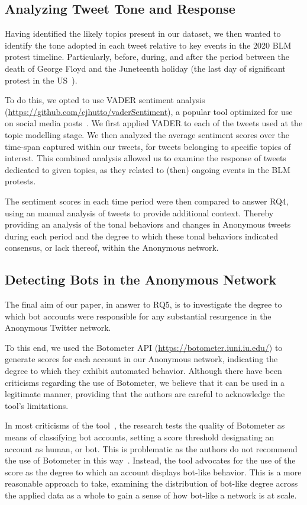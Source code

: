 \documentclass[letterpaper]{article}
\begin{document}
\subsection{Analyzing Tweet Tone and Response}

Having identified the likely topics present in our dataset, we then wanted to identify the tone adopted in each tweet relative to key events in the 2020 BLM protest timeline. Particularly, before, during, and after the period between the death of George Floyd and the Juneteenth holiday (the last day of significant protest in the US~\cite{NYT2020}).

To do this, we opted to use VADER sentiment analysis (\url{https://github.com/cjhutto/vaderSentiment}), a popular tool optimized for use on social media posts~\cite{Gilbert2014}. We first applied VADER to each of the tweets used at the topic modelling stage. We then analyzed the average sentiment scores over the time-span captured within our tweets, for tweets belonging to specific topics of interest. This combined analysis allowed us to examine the response of tweets dedicated to given topics, as they related to (then) ongoing events in the BLM protests.

The sentiment scores in each time period were then compared to answer RQ4, using an manual analysis of tweets to provide additional context. Thereby providing an analysis of the tonal behaviors and changes in Anonymous tweets during each period and the degree to which these tonal behaviors indicated consensus, or lack thereof, within the Anonymous network.

\subsection{Detecting Bots in the Anonymous Network}

The final aim of our paper, in answer to RQ5, is to investigate the degree to which bot accounts were responsible for any substantial resurgence in the Anonymous Twitter network.

To this end, we used the Botometer API (\url{https://botometer.iuni.iu.edu/}) to generate scores for each account in our Anonymous network, indicating the degree to which they exhibit automated behavior. Although there have been criticisms regarding the use of Botometer, we believe that it can be used in a legitimate manner, providing that the authors are careful to acknowledge the tool's limitations.

In most criticisms of the tool~\cite{Rauchfleisch2020}, the research tests the quality of Botometer as means of classifying bot accounts, setting a score threshold designating an account as human, or bot. This is problematic as the authors do not recommend the use of Botometer in this way~\cite{Ferrara2020}. Instead, the tool advocates for the use of the score as the degree to which an account displays bot-like behavior. This is a more reasonable approach to take, examining the distribution of bot-like degree across the applied data as a whole to gain a sense of how bot-like a network is at scale.
\end{document}
